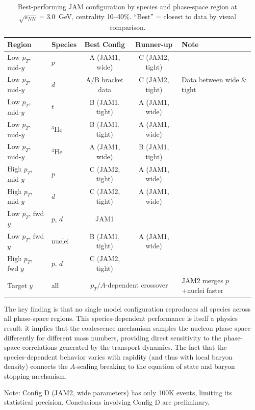 \documentclass[aps,prc,preprint,superscriptaddress,nofootinbib]{revtex4-2}
\begin{document}
\begin{table}[h]
\centering
\caption{Best-performing JAM configuration by species and phase-space region at $\sqrt{s_{NN}} = 3.0$~GeV, centrality 10--40\%. ``Best'' = closest to data by visual comparison.}
\label{tab:master_summary}
\begin{tabular}{llccl}
\toprule
Region & Species & Best Config & Runner-up & Note \\
\midrule
Low $p_T$, mid-$y$ & $p$ & A (JAM1, wide) & C (JAM2, tight) & \\
Low $p_T$, mid-$y$ & $d$ & A/B bracket data & C (JAM2, tight) & Data between wide \& tight \\
Low $p_T$, mid-$y$ & $t$ & B (JAM1, tight) & A (JAM1, wide) & \\
Low $p_T$, mid-$y$ & $^3$He & B (JAM1, tight) & A (JAM1, wide) & \\
Low $p_T$, mid-$y$ & $^4$He & A (JAM1, wide) & B (JAM1, tight) & \\
\midrule
High $p_T$, mid-$y$ & $p$ & C (JAM2, tight) & A (JAM1, wide) & \\
High $p_T$, mid-$y$ & $d$ & C (JAM2, tight) & A (JAM1, wide) & \\
\midrule
Low $p_T$, fwd $y$ & $p$, $d$ & JAM1 & & \\
Low $p_T$, fwd $y$ & nuclei & B (JAM1, tight) & A (JAM1, wide) & \\
High $p_T$, fwd $y$ & $p$, $d$ & C (JAM2, tight) & & \\
\midrule
Target $y$ & all & \multicolumn{2}{c}{$p_T/A$-dependent crossover} & JAM2 merges $p$+nuclei faster \\
\bottomrule
\end{tabular}
\end{table}

The key finding is that no single model configuration reproduces all species across all phase-space regions. This species-dependent performance is itself a physics result: it implies that the coalescence mechanism samples the nucleon phase space differently for different mass numbers, providing direct sensitivity to the phase-space correlations generated by the transport dynamics. The fact that the species-dependent behavior varies with rapidity (and thus with local baryon density) connects the $A$-scaling breaking to the equation of state and baryon stopping mechanism.

Note: Config D (JAM2, wide parameters) has only 100K events, limiting its statistical precision. Conclusions involving Config D are preliminary.
\end{document}
